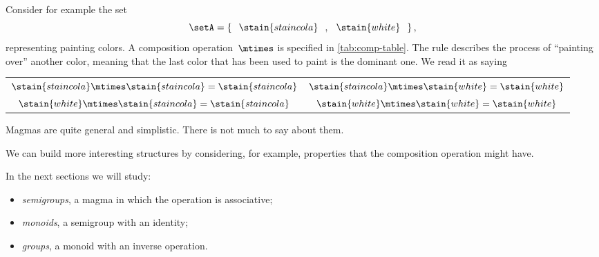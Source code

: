 Consider for example the set
\begin{equation*}
    \setA = \left\{\hspace{0.25cm} \stain{staincola}\hspace{0.25cm},\hspace{0.25cm} \stain{white}\hspace{0.25cm}\right\},
\end{equation*}
representing painting colors.
A composition operation~$\mtimes$ is specified in \cref{tab:comp-table}.
The rule describes the process of ``painting over'' another color, meaning that the last color that has been used to paint is the dominant one.
We read it as saying
\begin{center}
    \setlength{\tabcolsep}{20pt}
    \begin{tabular}{cc}
        $\stain{staincola} \mtimes \stain{staincola} = \stain{staincola}$ & $\stain{staincola} \mtimes \stain{white} = \stain{white}$ \\
        $\stain{white} \mtimes \stain{staincola}     = \stain{staincola}$ & $\stain{white} \mtimes \stain{white} = \stain{white}$
    \end{tabular}
\end{center}

Magmas are quite general and simplistic.
There is not much to say about them.

We can build more interesting structures by considering, for example, properties that the composition operation might have.

In the next sections we will study:

\begin{itemize}
    \item \emph{semigroups}, a magma in which the operation is associative;
    \item \emph{monoids}, a semigroup with an identity;
    \item \emph{groups}, a monoid with an inverse operation.
\end{itemize}